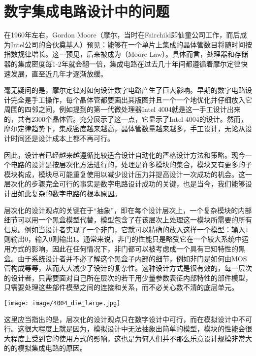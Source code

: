 \section{数字集成电路设计中的问题}
在1960年左右，Gordon Moore（摩尔，当时在Fairchild即仙童公司工作，而后成为Intel公司的合伙奠基人）预见：能够在一个单片上集成的晶体管数目将随时间按指数规律增长。这一预见，后来被成为（Moore Law）。具体而言，处理器和存储器的集成密度每1-2年就会翻一倍，集成电路在过去几十年间都遵循着摩尔定律快速发展，直至近几年才逐渐放缓。

毫无疑问的是，摩尔定律对如何设计数字电路产生了巨大影响。早期的数字电路设计完全是手工操作，每个晶体管都要画出其版图并且一个一个地优化并仔细放入它周围的四邻之间，例如提到的第一代微处理器Intel 4004就是这一手工设计出来的，共有2300个晶体管。充分展示了这一点，它显示了Intel 4004的设计。然而，摩尔定律趋势下，集成密度越来越高，晶体管数量越来越多，手工设计，无论从设计时间还是设计成本上都不再可行。

因此，设计者已经越来越遵循比较适合设计自动化的严格设计方法和策略。现今一个电路的设计是按层次化方法进行的，处理是许多模块的集合，模块又有更多的子模块构成，模块尽可能重复使用以减少设计压力并提高设计一次成功的机会。这一层次化的步骤完全可行的事实是数字电路设计成功的关键，也是当今，我们能够设计出如此复杂的数字电路的根本原因。

层次化的设计观点的关键在于“抽象”，即在每个设计层次上，一个复杂模块的内部细节可以用一个黑盒模型代替，模型包含了在该层次上处理这一模块所需要的所有信息。例如当设计者实现了一个非门，它就可以精确的放入这样一个模型：输入$1$则输出$0$，输入$0$则输出$1$。通常来说，非门的性能只是略受它在一个较大系统中运用方式的影响，因此在任何情况下，非门都可以被考虑成一个具有已知特性的黑盒。由于系统设计者并不必了解这个黑盒子内部的细节，例如非门是如何由MOS管构成等等，从而大大减少了设计的复杂性。这种设计方式是很有效的，每一层次的设计者，只需要面对自己所在层次的若干用少量参数表征内部特性的部件模型，只需要处理这些部件模型之间的连接和关系，而不必关心数不清的底层单元。

\begin{Figure}
    \texttt{[image: image/4004\_die\_large.jpg]}
\end{Figure}

这里应当指出的是，层次化的设计观点只在数字设计中可行，而在模拟设计中不可行。这很大程度上就是因为，模拟设计中无法抽象出简单的模型，模块的性能会很大程度上受到它的使用方式的影响，这也是为何人们并不那么乐意设计规模非常大的的模拟集成电路的原因。

